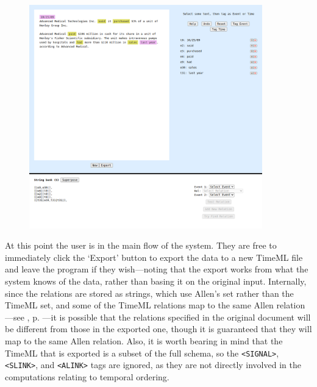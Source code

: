 \documentclass[a4paper,12pt,leqno,twoside]{article}
\begin{document}
\begin{center}
	\begin{figure}[h!]
		\centering
		\includegraphics[width=0.9\textwidth]{images/START-imported.png}
	\end{figure}
\end{center}
At this point the user is in the main flow of the system. They are free to immediately click the `Export' button to export the data to a new TimeML file and leave the program if they wish---noting that the export works from what the system knows of the data, rather than basing it on the original input. Internally, since the relations are stored as strings, which use Allen's set rather than the TimeML set, and some of the TimeML relations map to the same Allen relation---see , p. \pageref{fig:tlink-allen-translation}---it is possible that the relations specified in the original document will be different from those in the exported one, though it is guaranteed that they will map to the same Allen relation. Also, it is worth bearing in mind that the TimeML that is exported is a subset of the full schema, so the \verb|<SIGNAL>|, \verb|<SLINK>|, and \verb|<ALINK>| tags are ignored, as they are not directly involved in the computations relating to temporal ordering.
\end{document}
